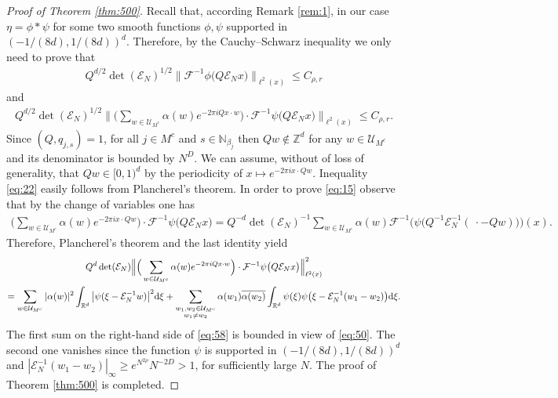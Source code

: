 \documentclass[a4paper,oneside]{amsart}
\theoremstyle{plain}
\theoremstyle{definition}
\numberwithin{equation}{section}
\newcounter{thm}
\theoremstyle{plain}
\newcommand{\RR}{\mathbb{R}}
\newcommand{\ZZ}{\mathbb{Z}}
\newcommand{\NN}{\mathbb{N}}
\renewcommand{\atop}[2]{\substack{{#1}\\{#2}}}
\newcommand{\8}{\infty}
\begin{document}
\begin{proof}[Proof of Theorem \ref{thm:500}]
Recall that, according Remark \ref{rem:1}, in our case $\eta=\phi*\psi$ for some two smooth functions
$\phi, \psi$
supported in $(-1/(8d), 1/(8d))^d$.  Therefore, by the Cauchy--Schwarz inequality we only need to prove
that
\begin{align}
  \label{eq:22}
Q^{d/2}\det(\mathcal E_N)^{1/2}\big\|\mathcal
  F^{-1}\phi\big(Q\mathcal E_N x\big)\big\|_{\ell^2(x)}\le C_{\rho, r}  
\end{align}
and
\begin{align}
  \label{eq:15}
Q^{d/2}\det(\mathcal E_N)^{1/2}\Big\|\Big(\sum_{w\in\mathcal U_{M^c}}\alpha(w)e^{-2\pi i Qx\cdot
    w}\Big)\cdot\mathcal
  F^{-1}\psi\big(Q\mathcal E_N x\big)\Big\|_{\ell^2(x)}\le C_{\rho, r}.
\end{align}
Since $(Q, q_{j, s})=1$, for all $j\in M^c$ and $s\in\NN_{\beta_j}$
then $Qw\not\in \ZZ^d$ for any $w\in\mathcal U_{M^c}$  and its
denominator is bounded by $N^D$. We can assume, without of loss of
generality, that $Qw\in[0, 1)^d$ by the periodicity of  $x\mapsto e^{-2\pi i x\cdot
    Qw}$.
Inequality \eqref{eq:22} easily follows from Plancherel's theorem. In
order to prove \eqref{eq:15} observe that by the change of variables
one has
\begin{align*}
  \Big(\sum_{w\in\mathcal U_{M^c}}\alpha(w)e^{-2\pi i x\cdot
    Qw}\Big)\cdot\mathcal
  F^{-1}\psi\big(Q\mathcal E_N x\big)=Q^{-d}\det(\mathcal E_N)^{-1}
  \sum_{w\in\mathcal U_{M^c}}\alpha(w)\mathcal
  F^{-1}\big(\psi\big(Q^{-1}\mathcal E_N^{-1}(\: \cdot-Qw) \big)\big)(x).
\end{align*}
 Therefore, Plancherel's theorem and the last identity yield  
 \begin{multline}
   \label{eq:58}
   Q^{d}\det(\mathcal E_N)\Big\|\Big(\sum_{w\in\mathcal U_{M^c}}\alpha(w)e^{-2\pi i Qx\cdot
    w}\Big)\cdot\mathcal
  F^{-1}\psi\big(Q\mathcal E_N x\big)\Big\|_{\ell^2(x)}^2\\=
\sum_{w\in\mathcal
  U_{M^c}}|\alpha(w)|^2\int_{\RR^d}\big|\psi(\xi-\mathcal E_N^{-1}w)\big|^2{\rm
d}\xi+\sum_{\atop{w_1, w_2\in\mathcal
  U_{M^c}}{w_1\not=w_2}}\alpha(w_1)\overline{\alpha(w_2)}\int_{\RR^d}\psi(\xi)\psi\big(\xi-\mathcal E_N^{-1}(w_1-w_2)\big){\rm
d}\xi.
 \end{multline}
The first sum on the right-hand side of \eqref{eq:58} is bounded in
view of \eqref{eq:50}. The second one vanishes since the function
$\psi$ is supported in $(-1/(8d), 1/(8d))^d$ and
$|\mathcal E_N^{-1}(w_1-w_2)|_{\infty}\ge e^{N^{2\rho}}N^{-2D}>1$,
for sufficiently large $N$.
The proof of Theorem \ref{thm:500} is completed.
\end{proof}
\end{document}
